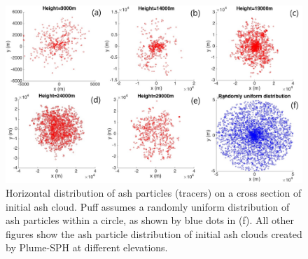 \documentclass[utf8]{frontiersSCNS} %
\begin{document}
\begin{figure}[!htb]
\centering
\includegraphics[width=1.0\textwidth]{Figures/particle_horizontal_distribution}
\caption{Horizontal distribution of ash particles (tracers) on a cross section of initial ash cloud. Puff assumes a randomly uniform distribution of ash particles within a circle, as shown by blue dots in (f). All other figures show the ash particle distribution of initial ash clouds created by Plume-SPH at different elevations.}
\label{fig:initial-cloud-horizontal}
\end{figure}
\end{document}
